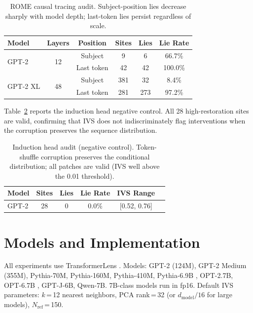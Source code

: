 \documentclass{article}
\begin{document}
\begin{table}[h]
\caption{ROME causal tracing audit. Subject-position lies decrease sharply with model depth; last-token lies persist regardless of scale.}
\label{tab:rome_cross}
\begin{center}\small
\begin{tabular}{lccccc}
\toprule
\textbf{Model} & \textbf{Layers} & \textbf{Position} & \textbf{Sites} & \textbf{Lies} & \textbf{Lie Rate} \\
\midrule
\multirow{2}{*}{GPT-2} & \multirow{2}{*}{12} & Subject & 9 & 6 & 66.7\% \\
& & Last token & 42 & 42 & 100.0\% \\
\midrule
\multirow{2}{*}{GPT-2 XL} & \multirow{2}{*}{48} & Subject & 381 & 32 & 8.4\% \\
& & Last token & 281 & 273 & 97.2\% \\
\bottomrule
\end{tabular}
\end{center}
\end{table}

Table~\ref{tab:induction_cross} reports the induction head negative control. All 28 high-restoration sites are valid, confirming that IVS does not indiscriminately flag interventions when the corruption preserves the sequence distribution.

\begin{table}[h]
\caption{Induction head audit (negative control). Token-shuffle corruption preserves the conditional distribution; all patches are valid (IVS well above the 0.01 threshold).}
\label{tab:induction_cross}
\begin{center}\small
\begin{tabular}{lccccc}
\toprule
\textbf{Model} & \textbf{Sites} & \textbf{Lies} & \textbf{Lie Rate} & \textbf{IVS Range} \\
\midrule
GPT-2 & 28 & 0 & 0.0\% & [0.52, 0.76] \\
\bottomrule
\end{tabular}
\end{center}
\end{table}

\section{Models and Implementation}
\label{app:details}

All experiments use TransformerLens \citep{nanda2022transformerlens}. Models: GPT-2 (124M), GPT-2 Medium (355M), Pythia-70M, Pythia-160M, Pythia-410M, Pythia-6.9B \citep{biderman2023pythia}, OPT-2.7B, OPT-6.7B \citep{zhang2022opt}, GPT-J-6B, Qwen-7B. 7B-class models run in fp16. Default IVS parameters: $k$\,=\,12 nearest neighbors, PCA rank\,=\,32 (or $d_\text{model}/16$ for large models), $N_\text{ref}$\,=\,150.
\end{document}
